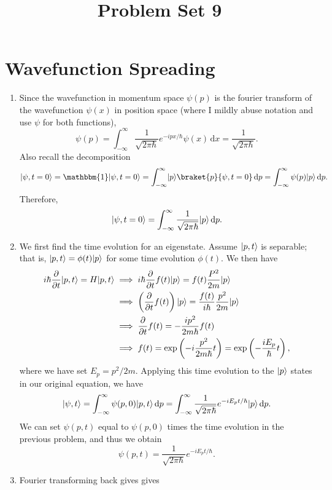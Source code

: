 \documentclass[11pt, letterpaper]{article}
\title{Problem Set 9}
\begin{document}
\makeproblem
\section{Wavefunction Spreading}

\begin{enumerate}
	\item Since the wavefunction in momentum space $\psi (p)$ is the fourier transform of the wavefunction $\psi (x)$ in position space (where I mildly abuse notation and use $\psi $ for both functions),
		\[
			\psi (p)=\int_{-\infty }^{\infty } \frac{1}{\sqrt{2\pi \hbar } } e^{-ipx/\hbar } \psi (x) \,\mathrm{d} x=\frac{1}{\sqrt{2\pi \hbar } } 
		.\]
		Also recall the decomposition
		\[
			\ket{\psi ,t=0} =\mathbbm{1}\ket{\psi ,t=0} =\int_{-\infty }^{\infty } \ket{p} \braket{p}{\psi ,t=0}  \,\mathrm{d} p=\int_{-\infty }^{\infty } \psi (p)\ket{p}  \,\mathrm{d} p
		.\]
		Therefore,
		\[
			\lvert\psi ,t=0\rangle =\int_{-\infty }^{\infty } \frac{1}{\sqrt{2\pi \hbar } } \lvert p\rangle  \,\mathrm{d} p
		.\]
	\item We first find the time evolution for an eigenstate. Assume $\lvert p,t\rangle $ is separable; that is, $\lvert p,t\rangle=\phi (t)\lvert p\rangle  $ for some time evolution $\phi (t)$. We then have
		\begin{align*}
			i\hbar \frac{\partial }{\partial t} \lvert p,t\rangle =H\lvert p,t\rangle &\implies i\hbar \frac{\partial }{\partial t} f(t)\lvert p\rangle =f(t) \frac{P^2}{2m} \lvert p\rangle \\
										  &\implies \left( \frac{\partial }{\partial t} f(t) \right) \lvert p\rangle =\frac{f(t)}{i\hbar } \frac{p^2}{2m} \lvert p\rangle \\
										  &\implies \frac{\partial }{\partial t} f(t)=-\frac{ip^2}{2m\hbar } f(t)\\
										  &\implies f(t)=\exp \left( -i\frac{p^2}{2m\hbar }t  \right) =\exp \left( -\frac{iE_p}{\hbar }t  \right) ,
		\end{align*}
		where we have set $E_p=p^2/2m$. Applying this time evolution to the $\lvert p\rangle $ states in our original equation, we have
		\[
			\lvert\psi ,t\rangle =\int_{-\infty }^{\infty } \psi (p,0)\lvert p,t\rangle  \,\mathrm{d} p=\int_{-\infty }^{\infty } \frac{1}{\sqrt{2\pi \hbar } } e^{-iE_pt/\hbar } \lvert p\rangle  \,\mathrm{d} p
		.\]
		We can set $\psi (p,t)$ equal to $\psi (p,0)$ times the time evolution in the previous problem, and thus we obtain
		\[
			\psi (p,t)=\frac{1}{\sqrt{2\pi \hbar } } e^{-iE_pt/\hbar } 
		.\]
	\item Fourier transforming back gives gives
		\begin{align*}

\end{align*}
\end{enumerate}
\end{document}
